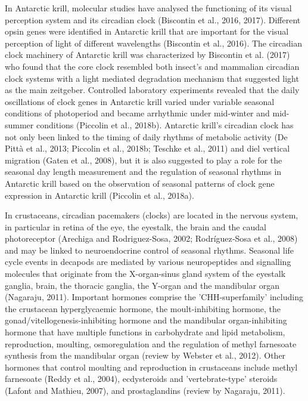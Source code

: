 In Antarctic krill, molecular studies have analysed the functioning of its
visual perception system and its circadian clock (Biscontin et al., 2016,
2017). Different opsin genes were identified in Antarctic krill that are
important for the visual perception of light of different wavelengths
(Biscontin et al., 2016). The circadian clock machinery of Antarctic krill was
characterized by Biscontin et al. (2017) who found that the core clock
resembled both insect's and mammalian circadian clock systems with a light
mediated degradation mechanism that suggested light as the main zeitgeber.
Controlled laboratory experiments revealed that the daily oscillations of clock
genes in Antarctic krill varied under variable seasonal conditions of
photoperiod and became arrhythmic under mid-winter and mid-summer conditions
(Piccolin et al., 2018b). Antarctic krill's circadian clock has not only been
linked to the timing of daily rhythms of metabolic activity (De Pittà et al.,
2013; Piccolin et al., 2018b; Teschke et al., 2011) and diel vertical migration
(Gaten et al., 2008), but it is also suggested to play a role for the seasonal
day length measurement and the regulation of seasonal rhythms in Antarctic
krill based on the observation of seasonal patterns of clock gene expression in
Antarctic krill (Piccolin et al., 2018a). 

In crustaceans, circadian pacemakers (clocks) are located in the nervous
system, in particular in retina of the eye, the eyestalk, the brain and the
caudal photoreceptor (Arechiga and Rodriguez-Sosa, 2002; Rodríguez‐Sosa et al.,
2008) and may be linked to neuroendocrine control of seasonal rhythms. Seasonal
life cycle events in decapods are mediated by various neuropeptides and
signalling molecules that originate from the X-organ-sinus gland system of the
eyestalk ganglia, brain, the thoracic ganglia, the Y-organ and the mandibular
organ (Nagaraju, 2011). Important hormones comprise the 'CHH-superfamily'
including the crustacean hyperglycaemic hormone, the moult-inhibiting hormone,
the gonad/vitellogenesis-inhibiting hormone and the mandibular organ-inhibiting
hormone that have multiple functions in carbohydrate and lipid metabolism,
reproduction, moulting, osmoregulation and the regulation of methyl farnesoate
synthesis from the mandibular organ (review by Webster et al., 2012). Other
hormones that control moulting and reproduction in crustaceans include methyl
farnesoate (Reddy et al., 2004), ecdysteroids and 'vertebrate-type' steroids
(Lafont and Mathieu, 2007), and prostaglandins (review by Nagaraju, 2011).

